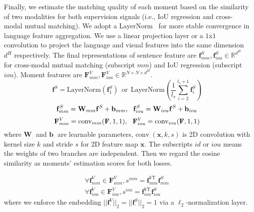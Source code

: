 \documentclass[letterpaper]{article} \usepackage{aaai22}  \usepackage{times}  \usepackage{helvet}  \usepackage{courier}  \usepackage[hyphens]{url}  \usepackage{graphicx} \urlstyle{rm} \def\UrlFont{\rm}  \usepackage{natbib}  \usepackage{caption} \DeclareCaptionStyle{ruled}{labelfont=normalfont,labelsep=colon,strut=off} \frenchspacing  \setlength{\pdfpagewidth}{8.5in}  \setlength{\pdfpageheight}{11in}  \usepackage{algorithm}
\begin{document}
 Finally, we estimate the matching quality of each moment based on the similarity of two modalities for both supervision signals (i.e., IoU regression and cross-modal mutual matching). We adopt a LayerNorm~\cite{DBLP:journals/corr/BaKH16} for more stable convergence in language feature aggregation. We use a linear projection layer or a $1$x$1$ convolution to project the language and visual features into the same dimension $d^H$ respectively. The final representations of sentence feature are $\mathbf{f}_{mm}^S, \mathbf{f}_{iou}^S \in \mathbb{R}^{d^H}$ for cross-modal mutual matching (subscript $mm$) and IoU regression (subscript $iou$). Moment features are $\mathbf{F}_{mm}^V, \mathbf{F}_{iou}^V \in \mathbb{R}^{N \times N \times d^H}$. 
\begin{equation}
\mathbf{f}^S = \text{LayerNorm}(\mathbf{f}^S_1) \ \ \text{or} \ \ \text{LayerNorm}(\frac{1}{l_s}\sum_{i=2}^{l_s+1} \mathbf{f}^S_i)
\label{equ:sent-fc}
\end{equation}
\begin{equation}
\mathbf{f}_{mm}^S = \mathbf{W}_{mm}\mathbf{f}^S + \mathbf{b}_{mm}, \ \
\mathbf{f}_{iou}^S = \mathbf{W}_{iou}\mathbf{f}^S + \mathbf{b}_{iou} \\
\end{equation}
\begin{equation}
 \mathbf{F}_{mm}^V = \text{conv}_{mm}(\mathbf{F}, 1, 1), \ \ \mathbf{F}_{iou}^V =\text{conv}_{iou}(\mathbf{F}, 1, 1) \\
 \end{equation}
where $\mathbf{W}_{\cdot}$ and $\mathbf{b}_{\cdot}$ are learnable parameters, $\text{conv}_{\cdot}(\mathbf{x}, k, s)$ is 2D convolution with kernel size $k$ and stride $s$ for 2D feature map $\mathbf{x}$. The subscripts $id$ or $iou$ means the weights of two branches are independent. Then we regard the cosine similarity as moments' estimation scores for both losses. 

\begin{equation}
\begin{aligned}
\forall \mathbf{f}^V_{mm} \in \mathbf{F}^V_{mm}, s^{mm} = \mathbf{f}^{V \mathrm{T}}_{mm} \mathbf{f}_{mm}^S\\ 
\forall \mathbf{f}^V_{iou} \in \mathbf{F}^V_{iou}, s^{iou} = \mathbf{f}^{V \mathrm{T}}_{iou} \mathbf{f}_{iou}^S
\end{aligned}
\end{equation}
where we enforce the embedding $||\mathbf{f}_{\cdot}^V||_2 = ||\mathbf{f}_{\cdot}^S||_2 =1$ via a $\ell_2$-normalization layer. 
\end{document}
